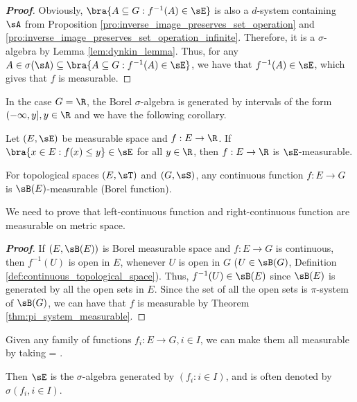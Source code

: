 \begin{proof}[\bf Proof]
Obviously, $\bra{A\subseteq G : f^{-1}(A) \in \sE}$ is also a $d$-system containing $\sA$ from
Proposition \ref{pro:inverse_image_preserves_set_operation} and \ref{pro:inverse_image_preserves_set_operation_infinite}. Therefore, it is a $\sigma$-algebra by Lemma \ref{lem:dynkin_lemma}. Thus, for any $A\in \sigma(\sA)\subseteq \bra{A\subseteq G : f^{-1}(A) \in \sE}$, we have that $f^{-1}(A) \in \sE$, which gives that $f$ is measurable.
\end{proof}

In the case $G = \R$, the Borel $\sigma$-algebra is generated by intervals of the form $(-\infty, y], y \in \R$ and we have the following corollary.

\begin{corollary}
Let $(E, \sE)$ be measurable space and $f:E\to \R$. If $\bra{x \in E : f(x) \leq y} \in \sE$ for all $y\in \R$, then $f : E \to \R$ is $\sE$-measurable. %
\end{corollary}

\begin{proposition}\label{pro:continuous_measurable}
For topological spaces $(E,\sT)$ and $(G,\sS)$, any continuous function $f : E \to G$ is $\sB(E)$-measurable (Borel function).
\end{proposition}

\begin{remark}
We need to prove that left-continuous function and right-continuous function are measurable on metric space.
\end{remark}

\begin{proof}[\bf Proof]
If $(E,\sB(E))$ is Borel measurable space and $f : E \to G$ is continuous, then $f^{-1}(U)$ is open in $E$, whenever $U$ is open in $G$ ($U\in \sB(G)$, Definition \ref{def:continuous_topological_space}). Thus, $f^{-1}(U)\in \sB(E)$ since $\sB(E)$ is generated by all the open sets in $E$. Since the set of all the open sets is $\pi$-system of $\sB(G)$, we can have that $f$ is measurable by Theorem \ref{thm:pi_system_measurable}.%
\end{proof}

\begin{definition}\label{def:sigma_algebra_generated_by_measurable_function}
Given any family of functions $f_i : E \to G, i \in I$, we can make them all measurable by taking
\be
\sE = \sigma{}.
\ee

Then $\sE$ is the $\sigma$-algebra generated by $(f_i : i \in I)$, and is often denoted by $\sigma(f_i, i \in I)$.
\end{definition}

